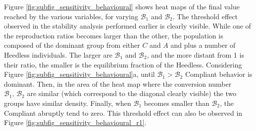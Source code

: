 Figure \ref{fig:subfig_sensitivity_behavioural} shows heat maps of the final value reached by the various variables, for varying $\mathcal{B}_1$ and $\mathcal{B}_2$.
The threshold effect observed in the stability analysis performed earlier is clearly visible. While one of the reproduction ratios becomes larger than the other, the population is composed of the dominant group from either $C$ and $A$ and plus a number of Heedless individuals. The larger are $\mathcal{B}_1$ and $\mathcal{B}_2$, and the more distant from 1 is their ratio, the  smaller is the equilibrium fraction of the Heedless. Considering Figure \ref{fig:subfig_sensitivity_behavioural}a, until $\mathcal{B}_1 > \mathcal{B}_2$ Compliant behavior is dominant. Then, in the area of the heat map where the conversion number $\mathcal{B}_1, \,\mathcal{B}_2$ are similar (which correspond to the diagonal clearly visible) the two groups have similar density. Finally, when $\mathcal{B}_1$ becomes smaller than $\mathcal{B}_2$, the Compliant abruptly tend to zero. This threshold effect can also be observed in Figure \ref{fig:subfig_sensitivity_behavioural_r1}.

